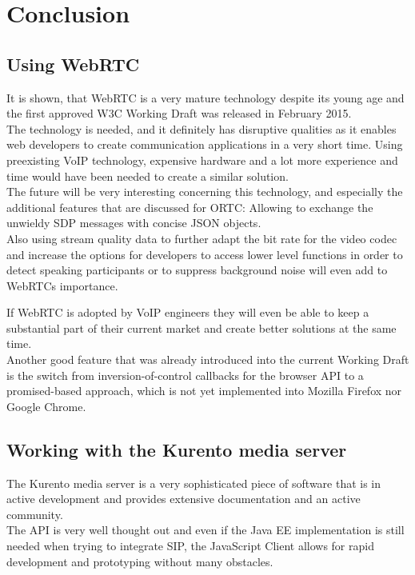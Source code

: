 \documentclass[../../../thesis.tex]{subfiles}
\begin{document}
\chapter{Conclusion}

\section{Using WebRTC}
It is shown, that WebRTC is a very mature technology despite its young age and the first approved W3C Working Draft was released in February 2015.\\

The technology is needed, and it definitely has disruptive qualities as it enables web developers to create communication applications in a very short time. Using preexisting VoIP technology, expensive hardware and a lot more experience and time would have been needed to create a similar solution.\\

The future will be very interesting concerning this technology, and especially the additional features that are discussed for ORTC\cite{ortc-api}: Allowing to exchange the unwieldy SDP messages with concise JSON objects. \\Also using stream quality data to further adapt the bit rate for the video codec and increase the options for developers to access lower level functions in order to detect speaking participants or to suppress background noise will even add to WebRTCs importance.\par 
If WebRTC is adopted by VoIP engineers they will even be able to keep a substantial part of their current market and create better solutions at the same time.\\

Another good feature that was already introduced into the current Working Draft is the switch from inversion-of-control callbacks for the browser API to a promised-based approach, which is not yet implemented into Mozilla Firefox nor Google Chrome.


\section{Working with the Kurento media server}
The Kurento media server is a very sophisticated piece of software that is in active development and provides extensive documentation and an active community.\\
The API is very well thought out and even if the Java EE implementation is still needed when trying to integrate SIP, the JavaScript Client\cite{kurento-client-doc} allows for rapid development and prototyping without many obstacles.
\end{document}
